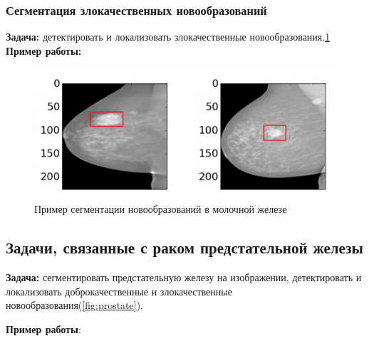 \subsubsection{Сегментация злокачественных новообразований}

{\bf Задача:} детектировать и локализовать злокачественные новообразования.\ref{fig:breast_3}
\\
{\bf Пример работы:} \cite{zhu_mil}

\begin{figure}[h] 
  \center
  \includegraphics [scale=0.8] {images/breast_cancer.png}
  \caption{ Пример сегментации новообразований в молочной железе\cite{zhu_mil} }
  \label{fig:breast_3}  
\end{figure}



\subsection{Задачи, связанные с раком предстательной железы}

{\bf Задача:} сегментировать предстательную железу на изображении, детектировать и локализовать доброкачественные и  злокачественные новообразования(\ref{fig:prostate}).

{\bf Пример работы}: \cite{prostate-cancer}

